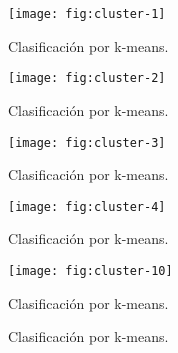 \begin{frame}{}
  \begin{figure}
    \centering
    \texttt{[image: fig:cluster-1]}
    \caption{Clasificación por k-means.}
    \label{}
  \end{figure}
\end{frame}

\begin{frame}{}
  \begin{figure}
    \centering
    \texttt{[image: fig:cluster-2]}
    \caption{Clasificación por k-means.}
    \label{}
  \end{figure}
\end{frame}

\begin{frame}{}
  \begin{figure}
    \centering
    \texttt{[image: fig:cluster-3]}
    \caption{Clasificación por k-means.}
    \label{}
  \end{figure}
\end{frame}

\begin{frame}{}
  \begin{figure}
    \centering
    \texttt{[image: fig:cluster-4]}
    \caption{Clasificación por k-means.}
    \label{}
  \end{figure}
\end{frame}

\begin{frame}{}
  \begin{figure}
    \centering
    \texttt{[image: fig:cluster-10]}
    \caption{Clasificación por k-means.}
    \label{}
  \end{figure}
\end{frame}

\begin{frame}{}
  \begin{figure}
    \centering
    \hspace{1cm}
    \caption{Clasificación por k-means.}
    \label{}
  \end{figure}
\end{frame}
